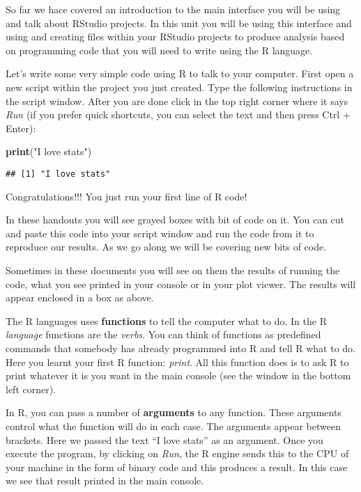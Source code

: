 \documentclass[
]{book}
\newenvironment{Shaded}{\begin{snugshade}}{\end{snugshade}}
\newcommand{\FunctionTok}[1]{\textcolor[rgb]{0.13,0.29,0.53}{\textbf{#1}}}
\newcommand{\NormalTok}[1]{#1}
\newcommand{\StringTok}[1]{\textcolor[rgb]{0.31,0.60,0.02}{#1}}
\begin{document}
So far we hace covered an introduction to the main interface you will be using and talk about RStudio projects. In this unit you will be using this interface and using and creating files within your RStudio projects to produce analysis based on programming code that you will need to write using the R language.

Let's write some very simple code using R to talk to your computer. First open a new script within the project you just created. Type the following instructions in the script window. After you are done click in the top right corner where it says \emph{Run} (if you prefer quick shortcuts, you can select the text and then press Ctrl + Enter):

\begin{Shaded}
\begin{Highlighting}[]
\FunctionTok{print}\NormalTok{(}\StringTok{"I love stats"}\NormalTok{)}
\end{Highlighting}
\end{Shaded}

\begin{verbatim}
## [1] "I love stats"
\end{verbatim}

Congratulations!!! You just run your first line of R code! 👏👏

In these handouts you will see grayed boxes with bit of code on it. You can cut and paste this code into your script window and run the code from it to reproduce our results. As we go along we will be covering new bits of code.

Sometimes in these documents you will see on them the results of running the code, what you see printed in your console or in your plot viewer. The results will appear enclosed in a box as above.

The R languages uses \textbf{functions} to tell the computer what to do. In the R \emph{language} functions are the \emph{verbs}. You can think of functions as predefined commands that somebody has already programmed into R and tell R what to do. Here you learnt your first R function: \emph{print}. All this function does is to ask R to print whatever it is you want in the main console (see the window in the bottom left corner).

In R, you can pass a number of \textbf{arguments} to any function. These arguments control what the function will do in each case. The arguments appear between brackets. Here we passed the text ``I love stats'' as an argument. Once you execute the program, by clicking on \emph{Run}, the R engine sends this to the CPU of your machine in the form of binary code and this produces a result. In this case we see that result printed in the main console.
\end{document}
